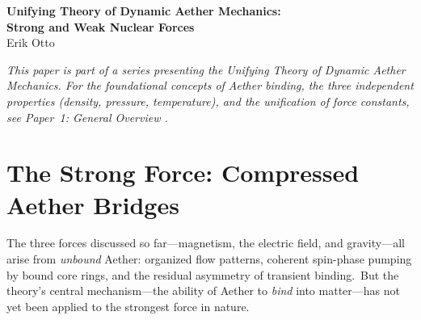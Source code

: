 ﻿\documentclass[12pt,letterpaper]{article}
\begin{document}
\begin{center}
{\LARGE\bfseries Unifying Theory of Dynamic Aether Mechanics:\\
Strong and Weak Nuclear Forces}\\[1em]
{\large Erik Otto}
\end{center}

\vspace{1em}

\begin{abstract}
Within the Dynamic Aether Mechanics framework, the strong force arises from
compressed Aether bridges---physical strands of quantum superfluid compressed to
$\sim\!7 \times 10^7$ times ambient density, connecting quark vortex endpoints.
This paper derives confinement (bridge snapping at $\sim$1.2~fm creates new
quark--antiquark pairs), asymptotic freedom (bridges are ``all core'' with
compactness $d/\xi \approx 1$--$2$), hadron mass (predominantly bridge compression
energy), and the deconfinement phase transition at $T \approx 170$~MeV.  Quantum
fluctuations of the bridge reproduce the L\"uscher term $-\pi/(12\,r)$, predict
Schwinger pair-creation rates that naturally separate chiral from potential-model
QCD at a crossover mass of $\sim$250~MeV, and explain the nucleon sigma term.
The weak force is identified as vortex topology transitions.  A unified summary
table relates all four fundamental forces through distinct Aether processes.
\end{abstract}

\vspace{1em}

\bigskip
\noindent\textit{This paper is part of a series presenting the Unifying Theory of
Dynamic Aether Mechanics.  For the foundational concepts of Aether binding,
the three independent properties (density, pressure, temperature), and the
unification of force constants, see Paper~1: General Overview \cite{otto-overview}.}
\bigskip

\section{The Strong Force: Compressed Aether Bridges}
\label{sec:strong-force}

The three forces discussed so far---magnetism, the electric field, and gravity---all
arise from \emph{unbound} Aether: organized flow patterns, coherent spin-phase
pumping by bound core rings, and the residual asymmetry of transient binding.\
But the theory's central mechanism---the ability of Aether to \emph{bind} into
matter---has not yet been applied to the strongest force in nature.
\end{document}
